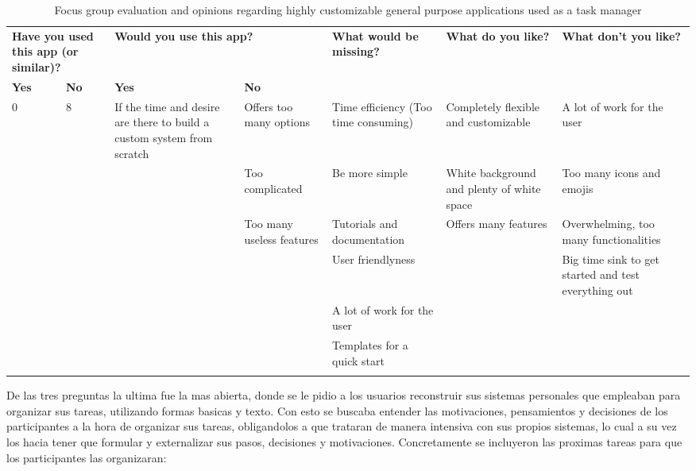 \FloatBarrier
\begin{table}[!htbp]
    \centering
    \begin{adjustbox}{width=1.2\textwidth,center=\textwidth}
        \begin{tabular}{|l|l|l|l|l|l|l|}
        \hline
        \multicolumn{2}{|l}{\textbf{Have you used this app (or similar)?}} & \multicolumn{2}{|l|}{\textbf{Would you use this app?}} & \multirow{2}{*}{\textbf{What would be missing?}} & \multirow{2}{*}{\textbf{What do you like?}} & \multirow{2}{*}{\textbf{What don't you like?}} \\ \cline{1-4}
        \textbf{Yes} & \textbf{No} & \textbf{Yes} & \textbf{No} & & & \\
        \hline
        \multirow{7}{*}{ 0 } & \multirow{7}{*}{ 8 } & If the time and desire are there to build a custom system from scratch & Offers too many options & Time efficiency (Too time consuming) & Completely flexible and customizable & A lot of work for the user \\ \cline{3-7}
        & & & Too complicated & Be more simple & White background and plenty of white space & Too many icons and emojis \\ \cline{3-7}
        & & & Too many useless features & Tutorials and documentation & Offers many features & Overwhelming, too many functionalities \\ \cline{3-7}
        & & & & User friendlyness & & Big time sink to get started and test everything out \\ \cline{3-7}
        & & & & A lot of work for the user & & \\ \cline{3-7}
        & & & & Templates for a quick start & & \\ \cline{3-7}
        & & & & & & \\ \hline
        \end{tabular}
    \end{adjustbox}
    \caption{Focus group evaluation and opinions regarding highly customizable general purpose applications used as a task manager}
    \label{tab:hcgpaEval}
\end{table}
\FloatBarrier

De las tres preguntas la ultima fue la mas abierta, donde se le pidio a los usuarios reconstruir sus sistemas personales que empleaban para organizar sus tareas, utilizando formas basicas y texto. Con esto se buscaba entender las motivaciones, pensamientos y decisiones de los participantes a la hora de organizar sus tareas, obligandolos a que trataran de manera intensiva con sus propios sistemas, lo cual a su vez los hacia tener que formular y externalizar sus pasos, decisiones y motivaciones. Concretamente se incluyeron las proximas tareas para que los participantes las organizaran:

